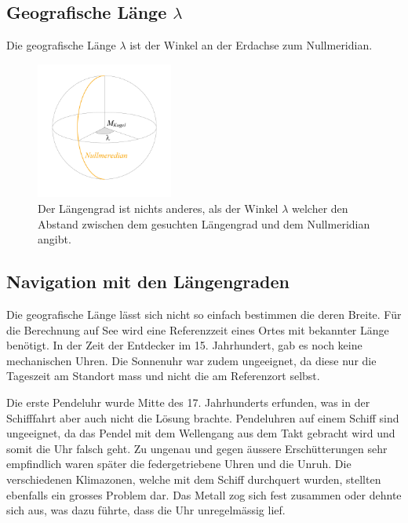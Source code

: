 \begin{refsection}
\subsection{Geografische Länge $\lambda$}
\begin{definition}
Die geografische Länge $\lambda$ ist der Winkel an der Erdachse zum Nullmeridian.
\end{definition}

\begin{figure}[htbp]
\centering
\includegraphics[width=0.4\textwidth]{kugel/GeografischeLaenge.jpg}
\caption{Der Längengrad ist nichts anderes, als der Winkel $\lambda$  welcher den Abstand zwischen dem gesuchten Längengrad und dem Nullmeridian angibt.}
\end{figure}

\subsection{Navigation mit den Längengraden}
Die geografische Länge lässt sich nicht so einfach bestimmen die deren Breite.
Für die Berechnung auf See wird eine Referenzzeit eines Ortes mit bekannter Länge benötigt.
In der Zeit der Entdecker im 15. Jahrhundert, gab es noch keine mechanischen Uhren. Die Sonnenuhr war zudem ungeeignet, da diese nur die Tageszeit am Standort mass und nicht die am Referenzort selbst.

Die erste Pendeluhr wurde Mitte des 17. Jahrhunderts erfunden, was in der Schifffahrt aber auch nicht die Lösung brachte. Pendeluhren auf einem Schiff sind ungeeignet, da das Pendel mit dem Wellengang aus dem Takt gebracht wird und somit die Uhr falsch geht.
Zu ungenau und gegen äussere Erschütterungen sehr empfindlich waren später die federgetriebene Uhren und die Unruh. Die verschiedenen Klimazonen, welche mit dem Schiff durchquert wurden, stellten ebenfalls ein grosses Problem dar. Das Metall zog sich fest zusammen oder dehnte sich aus, was dazu führte, dass die Uhr unregelmässig lief.


\end{refsection}
